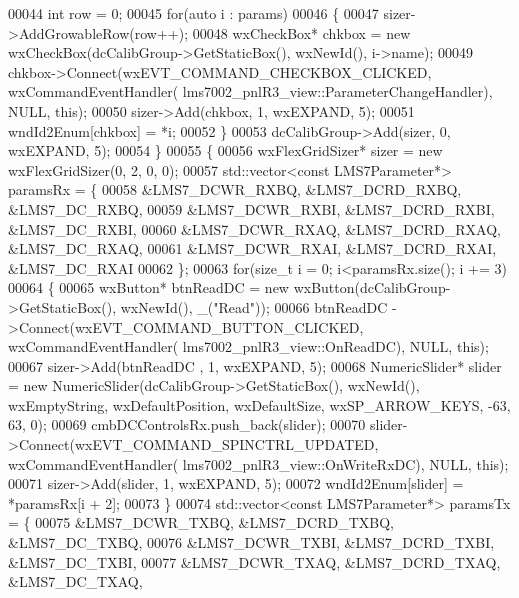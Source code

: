 \begin{DoxyCode}
00044             \textcolor{keywordtype}{int} row = 0;
00045             \textcolor{keywordflow}{for}(\textcolor{keyword}{auto} i : params)
00046             \{
00047                 sizer->AddGrowableRow(row++);
00048                 wxCheckBox* chkbox = \textcolor{keyword}{new} wxCheckBox(dcCalibGroup->GetStaticBox(), wxNewId(), 
      i->name);
00049                 chkbox->Connect(wxEVT\_COMMAND\_CHECKBOX\_CLICKED, wxCommandEventHandler(
      lms7002_pnlR3_view::ParameterChangeHandler), NULL, \textcolor{keyword}{this});
00050                 sizer->Add(chkbox, 1, wxEXPAND, 5);
00051                 wndId2Enum[chkbox] = *i;
00052             \}
00053             dcCalibGroup->Add(sizer, 0, wxEXPAND, 5);
00054         \}
00055         \{
00056             wxFlexGridSizer* sizer = \textcolor{keyword}{new} wxFlexGridSizer(0, 2, 0, 0);
00057             std::vector<const LMS7Parameter*> paramsRx = \{
00058                 &LMS7_DCWR_RXBQ, &LMS7_DCRD_RXBQ, &LMS7_DC_RXBQ,
00059                 &LMS7_DCWR_RXBI, &LMS7_DCRD_RXBI, &LMS7_DC_RXBI,
00060                 &LMS7_DCWR_RXAQ, &LMS7_DCRD_RXAQ, &LMS7_DC_RXAQ,
00061                 &LMS7_DCWR_RXAI, &LMS7_DCRD_RXAI, &LMS7_DC_RXAI
00062             \};
00063             \textcolor{keywordflow}{for}(\textcolor{keywordtype}{size\_t} i = 0; i<paramsRx.size(); i += 3)
00064             \{
00065                 wxButton* btnReadDC = \textcolor{keyword}{new} wxButton(dcCalibGroup->GetStaticBox(), wxNewId(), \_(\textcolor{stringliteral}{"Read"}));
00066                 btnReadDC ->Connect(wxEVT\_COMMAND\_BUTTON\_CLICKED, wxCommandEventHandler(
      lms7002_pnlR3_view::OnReadDC), NULL, \textcolor{keyword}{this});
00067                 sizer->Add(btnReadDC , 1, wxEXPAND, 5);
00068                 NumericSlider* slider = \textcolor{keyword}{new} NumericSlider(dcCalibGroup->GetStaticBox(), wxNewId(), 
      wxEmptyString, wxDefaultPosition, wxDefaultSize, wxSP\_ARROW\_KEYS, -63, 63, 0);
00069                 cmbDCControlsRx.push\_back(slider);
00070                 slider->Connect(wxEVT\_COMMAND\_SPINCTRL\_UPDATED, wxCommandEventHandler(
      lms7002_pnlR3_view::OnWriteRxDC), NULL, \textcolor{keyword}{this});
00071                 sizer->Add(slider, 1, wxEXPAND, 5);
00072                 wndId2Enum[slider] = *paramsRx[i + 2];
00073             \}
00074             std::vector<const LMS7Parameter*> paramsTx = \{
00075                 &LMS7_DCWR_TXBQ, &LMS7_DCRD_TXBQ, &LMS7_DC_TXBQ,
00076                 &LMS7_DCWR_TXBI, &LMS7_DCRD_TXBI, &LMS7_DC_TXBI,
00077                 &LMS7_DCWR_TXAQ, &LMS7_DCRD_TXAQ, &LMS7_DC_TXAQ,

\end{DoxyCode}
